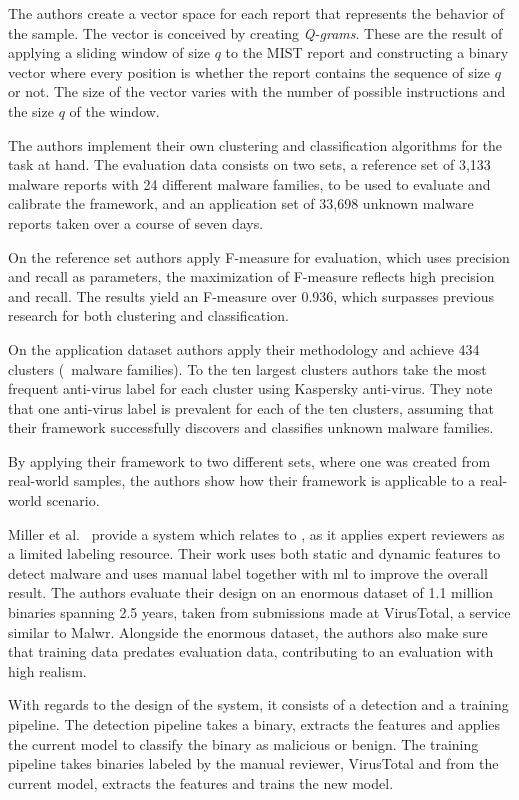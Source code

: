 The authors create a vector space for each report that represents the behavior of the sample.
The vector is conceived by creating \textit{Q-grams}.
These are the result of applying a sliding window of size $q$ to the MIST report and constructing a binary vector where every position is whether the report contains the sequence of size $q$ or not.
The size of the vector varies with the number of possible instructions and the size $q$ of the window.

The authors implement their own clustering and classification algorithms for the task at hand.
The evaluation data consists on two sets, a reference set of 3,133 malware reports with 24 different malware families, to be used to evaluate and calibrate the framework, and an application set of 33,698 unknown malware reports taken over a course of seven days.

On the reference set authors apply F-measure for evaluation, which uses precision and recall as parameters, the maximization of F-measure reflects high precision and recall.
The results yield an F-measure over 0.936, which surpasses previous research for both clustering and classification.

On the application dataset authors apply their methodology and achieve 434 clusters (\ie\ malware families).
To the ten largest clusters authors take the most frequent anti-virus label for each cluster using Kaspersky anti-virus.
They note that one anti-virus label is prevalent for each of the ten clusters, assuming that their framework successfully discovers and classifies unknown malware families.

By applying their framework to two different sets, where one was created from real-world samples, the authors show how their framework is applicable to a real-world scenario.

\medskip

Miller et al.~\cite{miller:rev_int} provide a system which relates to \cite{nissim:al_pdf}, as it applies expert reviewers as a limited labeling resource.
Their work uses both static and dynamic features to detect malware and uses manual label together with \gls{ml} to improve the overall result.
The authors evaluate their design on an enormous dataset of 1.1 million binaries spanning 2.5 years, taken from submissions made at VirusTotal, a service similar to Malwr.
Alongside the enormous dataset, the authors also make sure that training data predates evaluation data, contributing to an evaluation with high realism.

With regards to the design of the system, it consists of a detection and a training pipeline.
The detection pipeline takes a binary, extracts the features and applies the current model to classify the binary as malicious or benign.
The training pipeline takes binaries labeled by the manual reviewer, VirusTotal and from the current model, extracts the features and trains the new model.

